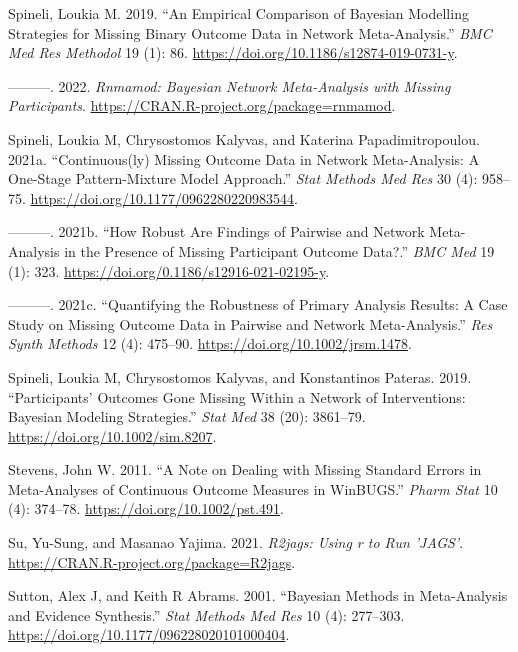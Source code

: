 \begin{CSLReferences}{1}{0}
\leavevmode{}%
Spineli, Loukia M. 2019. {``An Empirical Comparison of Bayesian Modelling Strategies for Missing Binary Outcome Data in Network Meta-Analysis.''} \emph{BMC Med Res Methodol} 19 (1): 86. \url{https://doi.org/10.1186/s12874-019-0731-y}.

\leavevmode{}%
---------. 2022. \emph{Rnmamod: Bayesian Network Meta-Analysis with Missing Participants}. \url{https://CRAN.R-project.org/package=rnmamod}.

\leavevmode{}%
Spineli, Loukia M, Chrysostomos Kalyvas, and Katerina Papadimitropoulou. 2021a. {``Continuous(ly) Missing Outcome Data in Network Meta-Analysis: A One-Stage Pattern-Mixture Model Approach.''} \emph{Stat Methods Med Res} 30 (4): 958--75. \url{https://doi.org/10.1177/0962280220983544}.

\leavevmode{}%
---------. 2021b. {``How Robust Are Findings of Pairwise and Network Meta-Analysis in the Presence of Missing Participant Outcome Data?.''} \emph{BMC Med} 19 (1): 323. \url{https://doi.org/0.1186/s12916-021-02195-y}.

\leavevmode{}%
---------. 2021c. {``Quantifying the Robustness of Primary Analysis Results: A Case Study on Missing Outcome Data in Pairwise and Network Meta-Analysis.''} \emph{Res Synth Methods} 12 (4): 475--90. \url{https://doi.org/10.1002/jrsm.1478}.

\leavevmode{}%
Spineli, Loukia M, Chrysostomos Kalyvas, and Konstantinos Pateras. 2019. {``Participants' Outcomes Gone Missing Within a Network of Interventions: Bayesian Modeling Strategies.''} \emph{Stat Med} 38 (20): 3861--79. \url{https://doi.org/10.1002/sim.8207}.

\leavevmode{}%
Stevens, John W. 2011. {``A Note on Dealing with Missing Standard Errors in Meta-Analyses of Continuous Outcome Measures in WinBUGS.''} \emph{Pharm Stat} 10 (4): 374--78. \url{https://doi.org/10.1002/pst.491}.

\leavevmode{}%
Su, Yu-Sung, and Masanao Yajima. 2021. \emph{R2jags: Using r to Run 'JAGS'}. \url{https://CRAN.R-project.org/package=R2jags}.

\leavevmode{}%
Sutton, Alex J, and Keith R Abrams. 2001. {``Bayesian Methods in Meta-Analysis and Evidence Synthesis.''} \emph{Stat Methods Med Res} 10 (4): 277--303. \url{https://doi.org/10.1177/096228020101000404}.


\end{CSLReferences}
